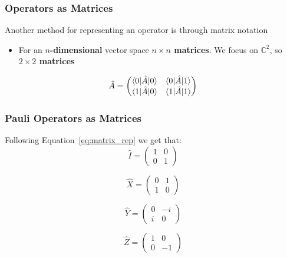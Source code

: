 \documentclass{beamer}
\begin{document}
\begin{frame}
	\frametitle{Operators as Matrices}
	Another method for representing an operator is through matrix notation
	\begin{itemize}
		\item For an \textbf{$n$-dimensional} vector space \textrightarrow \textbf{$n \times n$ matrices}. We focus on $\mathbb{C}^2$, so \textbf{$2 \times 2$ matrices}
	\end{itemize}
	\begin{equation}
		\hat{A} = \begin{pmatrix} 
			\braket{0 | \hat{A} | 0} & \braket{0 | \hat{A} | 1} \\ 
			\braket{1 | \hat{A} | 0} & \braket{1 | \hat{A} | 1} 
		\end{pmatrix}
		\label{eq:matrix_rep}
	\end{equation}
\end{frame}

\begin{frame}
	\frametitle{Pauli Operators as Matrices}
	Following Equation~\ref{eq:matrix_rep} we get that:
\begin{equation}
	\hat{I} = \begin{pmatrix} 
		1 & 0 \\ 
		0 & 1 
	\end{pmatrix}
	\label{eq:matrix_I}
\end{equation}

\begin{equation}
	\hat{X} = \begin{pmatrix} 
		0 & 1 \\ 
		1 & 0 
	\end{pmatrix}
	\label{eq:matrix_X}
\end{equation}

\begin{equation}
	\hat{Y} = \begin{pmatrix} 
		0 & -i \\ 
		i & 0 
	\end{pmatrix}
	\label{eq:matrix_Y}
\end{equation}

\begin{equation}
	\hat{Z} = \begin{pmatrix} 
		1 & 0 \\ 
		0 & -1 
	\end{pmatrix}
	\label{eq:matrix_Z}
\end{equation}	
\end{frame}
\end{document}
